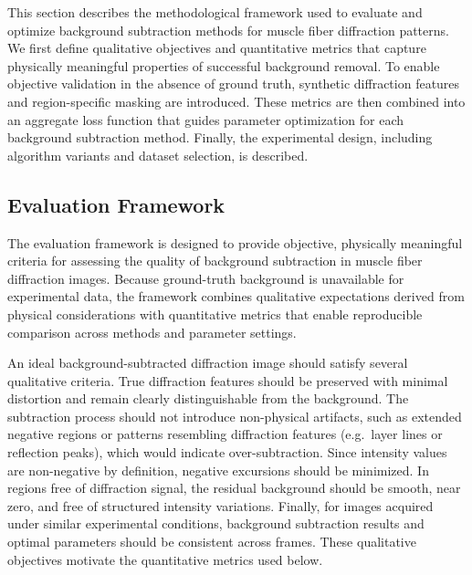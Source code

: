 \documentclass[iucr]{iucrjournals}
\begin{document}
This section describes the methodological framework used to evaluate and optimize background subtraction methods for muscle fiber diffraction patterns. We first define qualitative objectives and quantitative metrics that capture physically meaningful properties of successful background removal. To enable objective validation in the absence of ground truth, synthetic diffraction features and region-specific masking are introduced. These metrics are then combined into an aggregate loss function that guides parameter optimization for each background subtraction method. Finally, the experimental design, including algorithm variants and dataset selection, is described.

\subsection{Evaluation Framework}

The evaluation framework is designed to provide objective, physically meaningful criteria for assessing the quality of background subtraction in muscle fiber diffraction images. Because ground-truth background is unavailable for experimental data, the framework combines qualitative expectations derived from physical considerations with quantitative metrics that enable reproducible comparison across methods and parameter settings.


An ideal background-subtracted diffraction image should satisfy several qualitative criteria. True diffraction features should be preserved with minimal distortion and remain clearly distinguishable from the background. The subtraction process should not introduce non-physical artifacts, such as extended negative regions or patterns resembling diffraction features (e.g.\ layer lines or reflection peaks), which would indicate over-subtraction. Since intensity values are non-negative by definition, negative excursions should be minimized. In regions free of diffraction signal, the residual background should be smooth, near zero, and free of structured intensity variations. Finally, for images acquired under similar experimental conditions, background subtraction results and optimal parameters should be consistent across frames. These qualitative objectives motivate the quantitative metrics used below.
\end{document}
